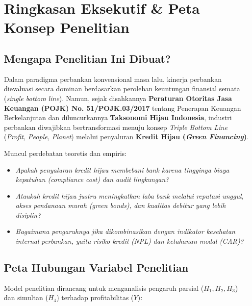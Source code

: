 \documentclass[11pt,a4paper]{article}
\begin{document}
\vspace{0.4cm}
\tableofcontents
\newpage

\section{Ringkasan Eksekutif \& Peta Konsep Penelitian}

\subsection{Mengapa Penelitian Ini Dibuat?}
Dalam paradigma perbankan konvensional masa lalu, kinerja perbankan dievaluasi secara dominan berdasarkan perolehan keuntungan finansial semata (\textit{single bottom line}). Namun, sejak disahkannya \textbf{Peraturan Otoritas Jasa Keuangan (POJK) No. 51/POJK.03/2017} tentang Penerapan Keuangan Berkelanjutan dan diluncurkannya \textbf{Taksonomi Hijau Indonesia}, industri perbankan diwajibkan bertransformasi menuju konsep \textit{Triple Bottom Line} (\textit{Profit, People, Planet}) melalui penyaluran \textbf{Kredit Hijau (\textit{Green Financing})}.

Muncul perdebatan teoretis dan empiris:
\begin{itemize}
    \item \textit{Apakah penyaluran kredit hijau membebani bank karena tingginya biaya kepatuhan (compliance cost) dan audit lingkungan?}
    \item \textit{Ataukah kredit hijau justru meningkatkan laba bank melalui reputasi unggul, akses pendanaan murah (green bonds), dan kualitas debitur yang lebih disiplin?}
    \item \textit{Bagaimana pengaruhnya jika dikombinasikan dengan indikator kesehatan internal perbankan, yaitu risiko kredit (NPL) dan ketahanan modal (CAR)?}
\end{itemize}

\subsection{Peta Hubungan Variabel Penelitian}
Model penelitian dirancang untuk menganalisis pengaruh parsial ($H_1, H_2, H_3$) dan simultan ($H_4$) terhadap profitabilitas ($Y$):
\end{document}
